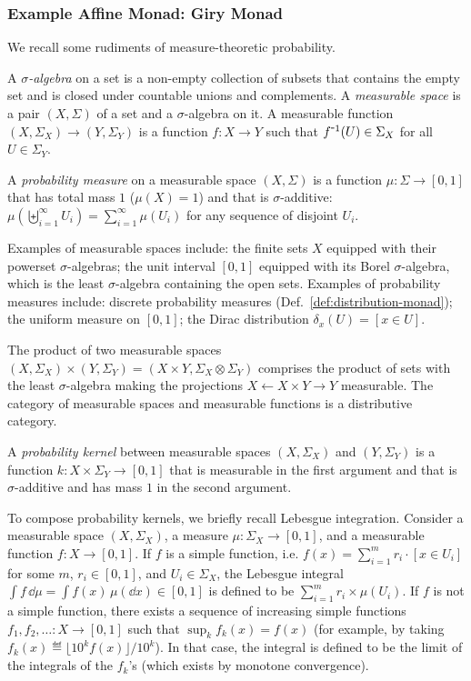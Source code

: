 \subsubsection{Example Affine Monad: Giry Monad}
\label{sec:probthy}
We recall some rudiments of measure-theoretic probability.
\begin{definition}
  A \emph{$\sigma$-algebra} on a set is a non-empty collection of subsets that contains the empty set and is closed under countable unions and complements. A \emph{measurable space} is a pair $(X,\Sigma)$ of a set and a $\sigma$-algebra on it.
  A measurable function $(X,\Sigma_X)\to (Y,\Sigma_Y)$ is a function $f\colon X\to Y$
  such that $f\inv(U)\in \Sigma_X$ for all $U\in \Sigma_Y$.
  
  A \emph{probability measure}
  on a measurable space $(X,\Sigma)$ is a function $\mu:\Sigma\to[0,1]$ that has total mass $1$ ($\mu(X)=1$) and that is $\sigma$-additive:
  $\mu(\biguplus_{i=1}^\infty U_i)=\sum_{i=1}^\infty \mu(U_i)$ for any sequence of disjoint $U_i$.
\end{definition}
Examples of measurable spaces include: the finite sets $X$ equipped with their powerset $\sigma$-algebras; the unit interval $[0,1]$ equipped with its Borel $\sigma$-algebra, which is the least $\sigma$-algebra containing the open sets.
Examples of probability measures include: discrete probability measures (Def.~\ref{def:distribution-monad}); the uniform measure on $[0,1]$; the Dirac distribution $\delta_x(U)={[x\in U]}$.

The product of two measurable spaces $(X,\Sigma_X)\times (Y,\Sigma_Y)=(X\times Y,\Sigma_X\otimes \Sigma_Y)$ comprises the product of sets with the least $\sigma$-algebra making the projections $X\leftarrow X\times Y\to Y$ measurable.
The category of measurable spaces and measurable functions is a distributive category. 

A \emph{probability kernel} between measurable spaces $(X,\Sigma_X)$ and $(Y,\Sigma_Y)$ is a function $k\colon X\times \Sigma_Y\to [0,1]$ that is measurable in the first argument and that is $\sigma$-additive and has mass $1$ in the second argument. 

To compose probability kernels, we briefly recall Lebesgue integration. Consider a measurable space $(X,\Sigma_X)$, 
a measure $\mu:\Sigma_X\to[0,1]$, and a measurable function $f\colon X\to [0,1]$. If $f$ is a simple function, i.e. $f(x) = \sum_{i = 1}^m r_i \cdot [x \in U_i]$ for some $m$, $r_i \in [0,1]$, and $U_i \in \Sigma_X$, the Lebesgue integral $\int f\,\dd \mu = \int f(x)\,\mu(\dd x)\in[0,1]$ is defined to be $\sum_{i = 1}^m r_i \times \mu(U_i)$. If $f$ is not a simple function, there exists a sequence of increasing simple functions $f_1,f_2,\ldots : X \to [0,1]$ such that $\sup_k f_k(x) = f(x)$ (for example, by taking $f_k(x) ≝ \lfloor 10^k f(x) \rfloor / 10^k$). In that case, the integral is defined to be the limit of the integrals of the $f_k$'s (which exists by monotone convergence). 



